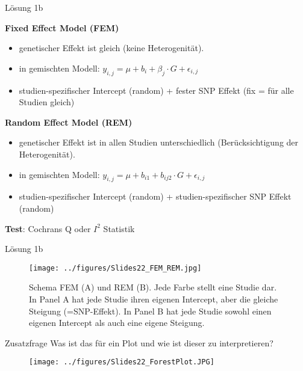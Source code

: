 \documentclass{beamer}
\begin{document}
\begin{frame}{Lösung 1b}

    \textbf{Fixed Effect Model (FEM)}

    \begin{itemize}
        \item genetischer Effekt ist gleich (keine Heterogenität). 
        \item in gemischten Modell: $y_{i,j} = \mu + b_i + \beta_j \cdot G + \epsilon_{i,j}$
        \item studien-spezifischer Intercept (random) + fester SNP Effekt (fix = für alle Studien gleich)  
    \end{itemize}

    \textbf{Random Effect Model (REM)}

    \begin{itemize}
        \item genetischer Effekt ist in allen Studien unterschiedlich (Berücksichtigung der Heterogenität). 
        \item in gemischten Modell: $y_{i,j} = \mu + b_{i1} + b_{ij2} \cdot G + \epsilon_{i,j}$
        \item studien-spezifischer Intercept (random) + studien-spezifischer SNP Effekt (random) 
    \end{itemize}

    \textbf{Test}: Cochrans Q oder $I^2$ Statistik
    
\end{frame}

\begin{frame}{Lösung 1b}
\begin{figure}[h]
\begin{center}
\texttt{[image: ../figures/Slides22\_FEM\_REM.jpg]}
\caption{Schema FEM (A) und REM (B). Jede Farbe stellt eine Studie dar. In Panel A hat jede Studie ihren eigenen Intercept, aber die gleiche Steigung (=SNP-Effekt). In Panel B hat jede Studie sowohl einen eigenen Intercept als auch eine eigene Steigung.}
\label{fig:FEM_REM}
\end{center}
\end{figure}
\end{frame}

\begin{frame}{Zusatzfrage}
    Was ist das für ein Plot und wie ist dieser zu interpretieren? 

\begin{figure}[h]
\begin{center}
\texttt{[image: ../figures/Slides22\_ForestPlot.JPG]}
\label{fig:Forestplot}
\end{center}
\end{figure}
    
\end{frame}
\end{document}
